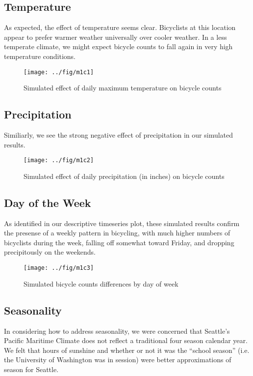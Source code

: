 \documentclass[final]{beamer}
\begin{document}
\begin{frame}[t]
\begin{multicols}{3}
\subsection{Temperature}

As expected, the effect of temperature seems clear. Bicyclists at this
location appear to prefer warmer weather universally over cooler
weather. In a less temperate climate, we might expect bicycle counts
to fall again in very high temperature conditions.

\begin{figure}[htbp]
\begin{center}
\texttt{[image: ../fig/m1c1]}
\caption{Simulated effect of daily maximum temperature on bicycle counts}
\label{fg:temp}
\end{center}
\end{figure}


\subsection{Precipitation}
Similiarly, we see the strong negative effect of precipitation in our simulated
results. 

\begin{figure}[htbp]
\begin{center}
\texttt{[image: ../fig/m1c2]}
\caption{Simulated effect of daily precipitation (in inches) on
  bicycle counts}
\label{fg:maxtemp}
\end{center}
\end{figure}

\subsection{Day of the Week}
As identified in our descriptive timeseries plot, these simulated
results confirm the presense of a weekly pattern in bicycling, with
much higher numbers of bicyclists during the week, falling off
somewhat toward Friday, and dropping precipitously on the weekends.
\begin{figure}[htbp]
\begin{center}
\texttt{[image: ../fig/m1c3]}
\caption{Simulated bicycle counts differences by day of week}
\label{fg:dow}
\end{center}
\end{figure}

\subsection{Seasonality}
In considering how to address seasonality, we were concerned that
Seattle's Pacific Maritime Climate does not reflect a traditional four
season calendar year. We felt that hours of sunshine and whether or
not it was the ``school season'' (i.e. the University of Washington
was in session) were better approximations of season for Seattle.


\end{multicols}
\end{frame}
\end{document}
